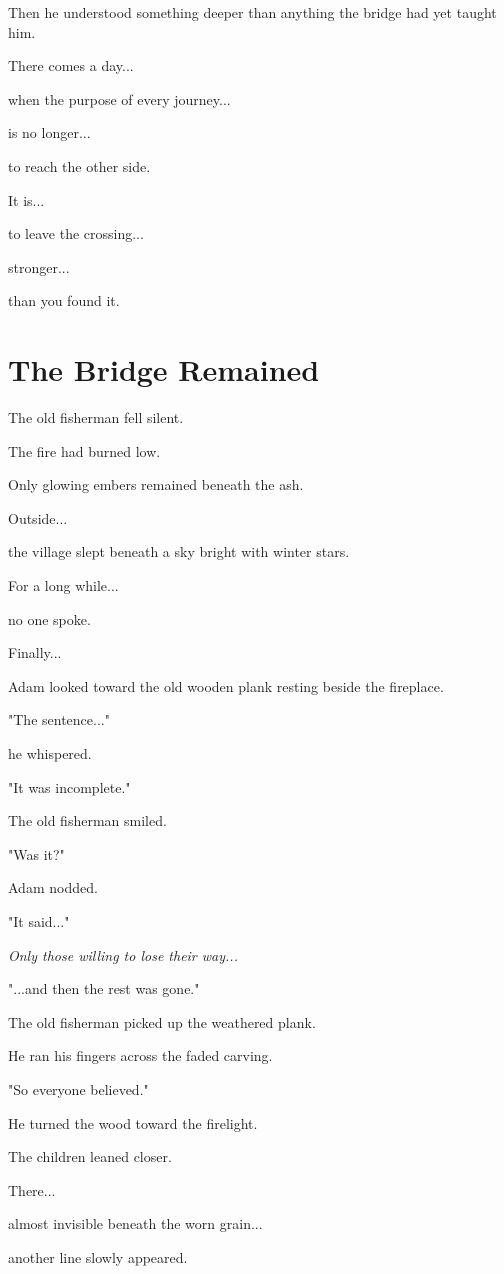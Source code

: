 \documentclass[12pt,openany]{book}
\begin{document}
Then he understood something deeper than anything the bridge had yet taught him.

There comes a day...

when the purpose of every journey...

is no longer...

to reach the other side.

It is...

to leave the crossing...

stronger...

than you found it.
\section*{The Bridge Remained}

The old fisherman fell silent.

The fire had burned low.

Only glowing embers remained beneath the ash.

Outside...

the village slept beneath a sky bright with winter stars.

For a long while...

no one spoke.

Finally...

Adam looked toward the old wooden plank resting beside the fireplace.

"The sentence..."

he whispered.

"It was incomplete."

The old fisherman smiled.

"Was it?"

Adam nodded.

"It said..."

\emph{Only those willing to lose their way...}

"...and then the rest was gone."

The old fisherman picked up the weathered plank.

He ran his fingers across the faded carving.

"So everyone believed."

He turned the wood toward the firelight.

The children leaned closer.

There...

almost invisible beneath the worn grain...

another line slowly appeared.
\end{document}
